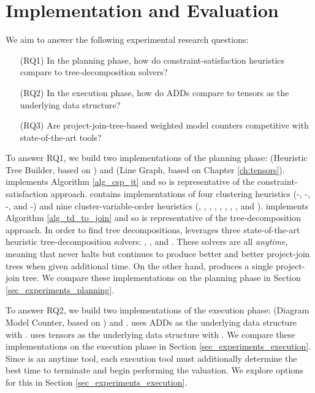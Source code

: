 \section{Implementation and Evaluation}
\label{sec_experiments}

We aim to answer the following experimental research questions:
\begin{itemize}
    \item[(RQ1)] In the planning phase, how do constraint-satisfaction heuristics compare to tree-decomposition solvers?
    \item[(RQ2)] In the execution phase, how do ADDs compare to tensors as the underlying data structure?
    \item[(RQ3)] Are project-join-tree-based weighted model counters competitive with state-of-the-art tools?
\end{itemize}

To answer RQ1, we build two implementations of the planning phase: \Htb{} (Heuristic Tree Builder, based on \cite{DPV20,phan2019weighted}) and \Lg{} (Line Graph, based on Chapter \ref{ch:tensors}).
\Htb{} implements Algorithm \ref{alg_csp_jt} and so is representative of the constraint-satisfaction approach.
\Htb{} contains implementations of four clustering heuristics (\Be-\ListH, \Be-\TreeH, \Bm-\ListH, and \Bm-\TreeH) and nine cluster-variable-order heuristics (\Random, \Mcs, \Invmcs, \Lexp, \Invlexp, \Lexm, \Invlexm, \Minfill, and \Invminfill).
\Lg{} implements Algorithm \ref{alg_td_to_join} and so is representative of the tree-decomposition approach.
In order to find tree decompositions, \Lg{} leverages three state-of-the-art heuristic tree-decomposition solvers: \Flowcutter{} \cite{strasser2017computing}, \Htd{} \cite{AMW17}, and \Tamaki{} \cite{Tamaki17}.
These solvers are all \emph{anytime}, meaning that \Lg{} never halts but continues to produce better and better project-join trees when given additional time.
On the other hand, \Htb{} produces a single project-join tree.
We compare these implementations on the planning phase in Section \ref{sec_experiments_planning}.

To answer RQ2, we build two implementations of the execution phase: \Dmc{} (Diagram Model Counter, based on \cite{DPV20,phan2019weighted}) and \Tensor{}.
\Dmc{} uses ADDs as the underlying data structure with \cudd{} \cite{somenzi2015cudd}.
\Tensor{} uses tensors as the underlying data structure with \Numpy{} \cite{numpy}.
We compare these implementations on the execution phase in Section \ref{sec_experiments_execution}.
Since \Lg{} is an anytime tool, each execution tool must additionally determine the best time to terminate \Lg{} and begin performing the valuation.
We explore options for this in Section \ref{sec_experiments_execution}.

